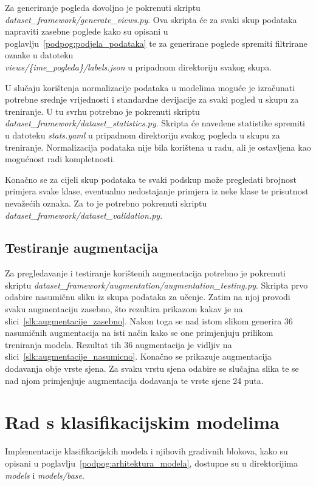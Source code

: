 \documentclass[diplomskirad]{fer}
\begin{document}
			Za generiranje pogleda dovoljno je pokrenuti skriptu \textit{dataset\_framework/generate\_views.py}. Ova skripta će za svaki skup podataka napraviti zasebne poglede kako su opisani u poglavlju~\ref{podpog:podjela_podataka} te za generirane poglede spremiti filtrirane oznake u datoteku\\\textit{views/\{ime\_pogleda\}/labels.json} u pripadnom direktoriju svakog skupa.
			
			U slučaju korištenja normalizacije podataka u modelima moguće je izračunati potrebne srednje vrijednosti i standardne devijacije za svaki pogled u skupu za treniranje. U tu svrhu potrebno je pokrenuti skriptu \textit{dataset\_framework/dataset\_statistics.py}. Skripta će navedene statistike spremiti u datoteku \textit{stats.yaml} u pripadnom direktoriju svakog pogleda u skupu za treniranje. Normalizacija podataka nije bila korištena u radu, ali je ostavljena kao mogućnost radi kompletnosti. 
			
			Konačno se za cijeli skup podataka te svaki podskup može pregledati brojnost primjera svake klase, eventualno nedostajanje primjera iz neke klase te prisutnost nevažećih oznaka. Za to je potrebno pokrenuti skriptu \textit{dataset\_framework/dataset\_validation.py}.
		
		\subsection{Testiranje augmentacija}
			Za pregledavanje i testiranje korištenih augmentacija potrebno je pokrenuti skriptu \textit{dataset\_framework/augmentation/augmentation\_testing.py}. Skripta prvo odabire nasumičnu sliku iz skupa podataka za učenje. Zatim na njoj provodi svaku augmentaciju zasebno, što rezultira prikazom kakav je na slici~\ref{slk:augmentacije_zasebno}. Nakon toga se nad istom slikom generira 36 nasumičnih augmentacija na isti način kako se one primjenjuju prilikom treniranja modela. Rezultat tih 36 augmentacija je vidljiv na slici~\ref{slk:augmentacije_nasumicno}. Konačno se prikazuje augmentacija dodavanja obje vrste sjena. Za svaku vrstu sjena odabire se slučajna slika te se nad njom primjenjuje augmentacija dodavanja te vrste sjene 24 puta.
	
	\section{Rad s klasifikacijskim modelima}
		Implementacije klasifikacijskih modela i njihovih gradivnih blokova, kako su opisani u poglavlju~\ref{podpog:arhitektura_modela}, dostupne su u direktorijima \textit{models} i \textit{models/base}.
		
\end{document}
